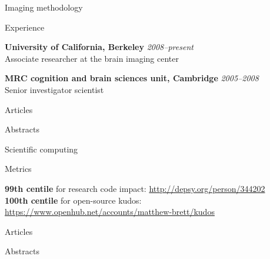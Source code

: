 \documentclass{cv}
\newcommand{\PlaceDateNote}[3]{{\bf #1} \hfill {\em #2} \\#3}
\newcommand{\UCB}{University of California, Berkeley}
\newcommand{\CBU}{MRC cognition and brain sciences unit, Cambridge}
\begin{document}
\begin{cvSection}{Imaging methodology}

\begin{cvSubSection}{Experience}

\PlaceDateNote{\UCB}{2008--present }{
Associate researcher at the brain imaging center}

\PlaceDateNote{\CBU}{2005--2008}{
Senior investigator scientist}

\end{cvSubSection}

\begin{cvSubSection}{Articles}

\printbibliography[heading=none,
    keyword=methods,
    keyword=article,
notkeyword=omit]

\end{cvSubSection}

\begin{cvSubSection}{Abstracts}

\printbibliography[heading=none,
    keyword=methods,
    keyword=abstract,
notkeyword=omit]

\end{cvSubSection}

\end{cvSection}

\begin{cvSection}{Scientific computing}

\begin{cvSubSection}{Metrics}

{\bf 99th centile} for research code impact: \url{http://depsy.org/person/344202} \\
{\bf 100th centile} for open-source kudos: \url{https://www.openhub.net/accounts/matthew-brett/kudos}

\end{cvSubSection}

\begin{cvSubSection}{Articles}

\printbibliography[heading=none,
    keyword=computing,
    keyword=article,
notkeyword=omit]

\end{cvSubSection}

\begin{cvSubSection}{Abstracts}

\printbibliography[heading=none,
    keyword=computing,
    keyword=abstract,
notkeyword=omit]

\end{cvSubSection}

\end{cvSection}
\end{document}
